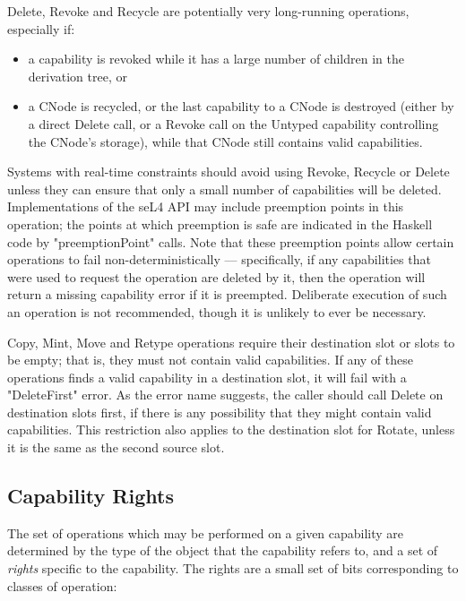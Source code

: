 Delete, Revoke and Recycle are potentially very long-running operations, especially if:
\begin{itemize}
\item a capability is revoked while it has a large number of children in the
derivation tree, or
\item a CNode is recycled, or the last capability to a CNode is destroyed (either by a direct Delete call, or a Revoke call on the Untyped capability controlling the CNode's storage), while that CNode still contains valid capabilities.
\end{itemize}

Systems with real-time constraints should avoid using Revoke, Recycle or Delete unless
they can ensure that only a small number of capabilities will be deleted.
Implementations of the seL4 API may include preemption points in this operation; the points at which preemption is safe are indicated in the Haskell code by "preemptionPoint" calls. Note that these preemption points allow certain operations to fail non-deterministically --- specifically, if any capabilities that were used to request the operation are deleted by it, then the operation will return a missing capability error if it is preempted. Deliberate execution of such an operation is not recommended, though it is unlikely to ever be necessary.

Copy, Mint, Move and Retype operations require their destination slot
or slots to be empty; that is, they must not contain valid capabilities. If any
of these operations finds a valid capability in a destination slot, it will
fail with a "DeleteFirst" error. As the error name suggests, the caller should
call Delete on destination slots first, if there is any possibility that they
might contain valid capabilities. This restriction also applies to the destination slot for Rotate, unless it is the same as the second source slot.

\subsection[rights]{Capability Rights}

The set of operations which may be performed on a given capability are
determined by the type of the object that the capability refers to, and a set
of \emph{rights} specific to the capability. The rights are a small set of bits corresponding to classes of operation:

